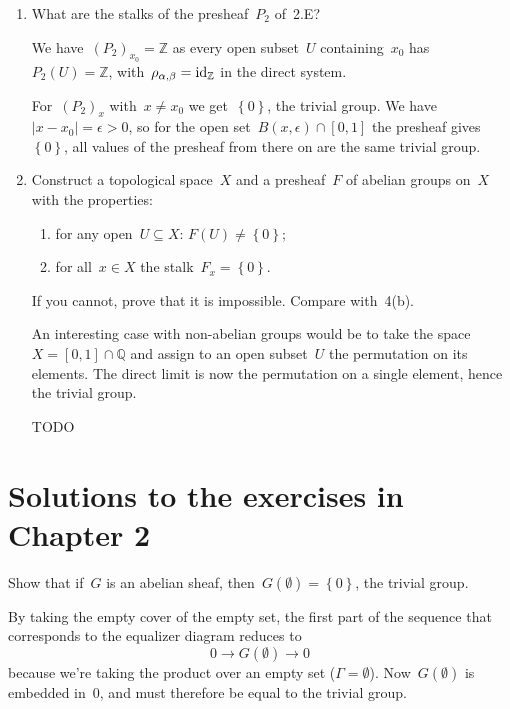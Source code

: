 \documentclass[a4paper,11pt,oneside,openany,article]{memoir}
\begin{document}
\begin{enumerate}
  \item What are the stalks of the presheaf~$P_2$ of~2.E?

    \begin{solution}
      We have~$(P_2)_{x_0}=\mathbb{Z}$ as every open subset~$U$ containing~$x_0$ has~$P_2(U)=\mathbb{Z}$, with~$\rho_{\alpha,\beta}=\operatorname{id}_{\mathbb{Z}}$ in the direct system.

      For~$(P_2)_{x}$ with~$x\neq x_0$ we get~$\left\{ 0 \right\}$, the trivial group. We have~$|x-x_0|=\epsilon>0$, so for the open set~$B(x,\epsilon)\cap[0,1]$ the presheaf gives~$\left\{ 0 \right\}$, all values of the presheaf from there on are the same trivial group.
    \end{solution}

  \item Construct a topological space~$X$ and a presheaf~$F$ of abelian groups on~$X$ with the properties:
    \begin{enumerate}
      \item for any open~$U\subseteq X$: $F(U)\neq\left\{ 0 \right\}$;
      \item for all~$x\in X$ the stalk~$F_x=\left\{ 0 \right\}$.
    \end{enumerate}
    If you cannot, prove that it is impossible. Compare with~4(b).

    \begin{solution}
      An interesting case with non-abelian groups would be to take the space~$X=[0,1]\cap\mathbb{Q}$ and assign to an open subset~$U$ the permutation on its elements. The direct limit is now the permutation on a single element, hence the trivial group.

      TODO
    \end{solution}
\end{enumerate}

\clearpage

\chapter{Solutions to the exercises in Chapter 2}
\begin{exercise}[1.9]
  Show that if~$G$ is an abelian sheaf, then~$G(\emptyset)=\left\{ 0 \right\}$, the trivial group.

  \begin{solution}
    By taking the empty cover of the empty set, the first part of the sequence that corresponds to the equalizer diagram reduces to
    \begin{equation}
      0\to G(\emptyset)\to 0
    \end{equation}
    because we're taking the product over an empty set ($\Gamma=\emptyset$). Now~$G(\emptyset)$ is embedded in~$0$, and must therefore be equal to the trivial group.
  \end{solution}
\end{exercise}
\end{document}
